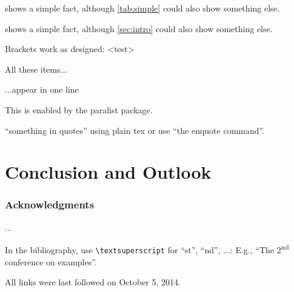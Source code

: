 \documentclass[runningheads,a4paper]{llncs}
\begin{document}
 shows a simple fact, although \cref{tab:simple} could also show something else.

 shows a simple fact, although \cref{sec:intro} could also show something else.

Brackets work as designed:
<test>

\begin{inparaenum}
\item All these items...
\item ...appear in one line
\item This is enabled by the paralist package.
\end{inparaenum}

``something in quotes'' using plain tex or use \enquote{the enquote command}.

\section{Conclusion and Outlook}

\subsubsection*{Acknowledgments}
...

In the bibliography, use \texttt{\textbackslash textsuperscript} for ``st'', ``nd'', ...:
E.g., \enquote{The 2\textsuperscript{nd} conference on examples}.




All links were last followed on October 5, 2014.
\end{document}
